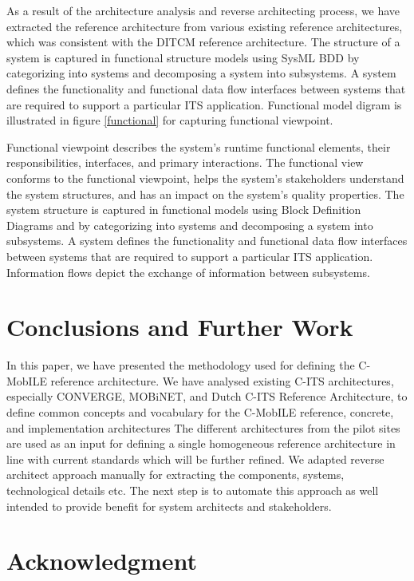 \documentclass[conference]{IEEEtran}
\begin{document}
As a result of the architecture analysis and reverse architecting process, we have extracted the reference architecture from various existing reference architectures, which was consistent with the DITCM reference architecture.
The structure of a system is captured in functional structure models using SysML BDD by categorizing into systems and decomposing a system into subsystems.
A system defines the functionality and functional data flow interfaces between systems that are required to support a particular ITS application.
Functional model digram is illustrated in figure \ref{functional} for capturing functional viewpoint.



Functional viewpoint describes the system’s runtime functional elements, their responsibilities, interfaces, and primary interactions.
The functional view conforms to the functional viewpoint, helps the system’s stakeholders understand the system structures, and has an impact on the system’s quality properties.
The system structure is captured in functional models using Block Definition Diagrams and by categorizing into systems and decomposing a system into subsystems.
A system defines the functionality and functional data flow interfaces between systems that are required to support a particular ITS application.
Information flows depict the exchange of information between subsystems.


\section{Conclusions and Further Work}

In this paper, we have presented the methodology used for defining the C-MobILE reference architecture.
We have analysed existing C-ITS architectures, especially CONVERGE, MOBiNET, and Dutch C-ITS Reference Architecture, to define common concepts and vocabulary for the C-MobILE reference, concrete, and implementation architectures The different architectures from the pilot sites are used as an input for defining a single homogeneous reference architecture in line with current standards which will be further refined.
We adapted reverse architect approach manually for extracting the components, systems, technological details etc.
The next step is to automate this approach as well intended to provide benefit for system architects and stakeholders.


\section*{Acknowledgment}
\end{document}

